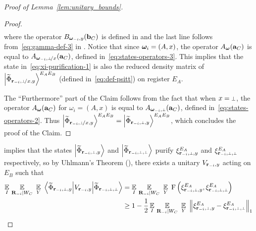 \begin{proof}[Proof of Lemma~\ref{lem:unitary_bounds}]
\begin{proof}
\begin{align}
\label{eq:xi-purification-1}
\end{align}
where the operator $B_{{\boldsymbol{\omega}}_{-i}, y} (\mathbf{b}_C)$ is defined in  and the last line follows from~\eqref{eq:gamma-def-3} in . Notice that since ${\boldsymbol{\omega}}_i = (A,x)$, the operator $A_{\boldsymbol{\omega}}(\mathbf{a}_C)$ is equal to $A_{\bomega_\mi,\dummyx}(\ba_C)$, defined in~\eqref{eq:states-operators-3}. This implies that the state in~\eqref{eq:xi-purification-1} is also the reduced density matrix of $\bigket{\wt{\Phi}_\sspxy}^{E_A E_B}$ (defined in~\eqref{eq:def-psitt}) on register $E_A$. 

The ``Furthermore'' part of the Claim follows from the fact that when $x = \dummy$, the operator $A_{\boldsymbol{\omega}}(\mathbf{a}_C)$ for $\omega_i = (A,x)$ is equal to $A_{\bomega_\mi,\dummy}(\ba_C)$, defined in~\eqref{eq:states-operators-2}. Thus $\bigket{\wt{\Phi}_\sspxy}^{E_A E_B} = \bigket{\wt{\Phi}_\sspy}^{E_A E_B}$, which concludes the proof of the Claim.
\end{proof}
 
 implies that the states $\bigket{\wt{\Phi}_\sspy}$ and $\bigket{\wt{\Phi}_\sspp}$ purify $\xi^{E_A}_\sspy$ and $\xi^{E_A}_\sspp$ respectively, so by Uhlmann's Theorem (), there exists a unitary $V_{\mathbf{r}_{-i}, y}$ acting on $E_B$ such that  
\begin{align}
	\Ex_I \, \Ex_{\bR_\mi |  W_C} \, \, \Ex_{Y} \,\,  \bigbra{\wt{\Phi}_\sspy } V_{\br_\mi, y}  \bigket{\wt{\Phi}_\sspp}  
	&= \Ex_I \, \Ex_{\bR_\mi |  W_C} \, \, \Ex_{Y}  \,\, \F \left (\xi_\sspy^{E_A}, \xi_\sspp^{E_A} \right)  \notag \\
	& \geq 1 - \frac{1}{2} \Ex_I \, \Ex_{\bR_\mi |  W_C} \, \, \Ex_{Y}  \,\,  \Big \| \xi^{E_A}_\sspy - \xi^{E_A}_\sspp \Big \|_1 \notag \\

\end{align}
\end{proof}
